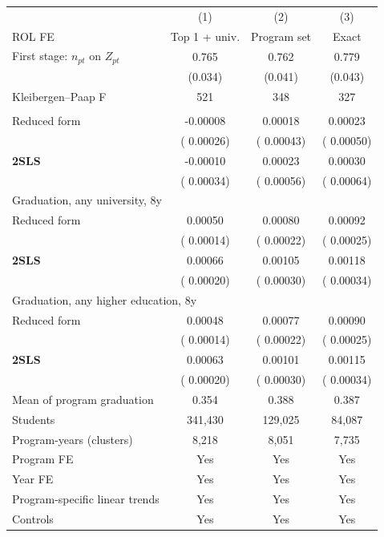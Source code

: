 \begin{tabular}{lccc}
\toprule
 & (1) & (2) & (3) \\
ROL FE & Top 1 + univ. & Program set & Exact \\
\midrule
First stage: \(n_{pt}\) on \(Z_{pt}\) &  0.765\sym{***} &  0.762\sym{***} &  0.779\sym{***} \\
 & (0.034) & (0.041) & (0.043) \\
Kleibergen--Paap F &    521 &    348 &    327 \\
\addlinespace
\multicolumn{4}{l}{Graduation, enrolled program, 8y} \\
\quad Reduced form & -0.00008 &  0.00018 &  0.00023 \\
 & ( 0.00026) & ( 0.00043) & ( 0.00050) \\
\quad \textbf{2SLS} & -0.00010 &  0.00023 &  0.00030 \\
 & ( 0.00034) & ( 0.00056) & ( 0.00064) \\
\multicolumn{4}{l}{Graduation, any university, 8y} \\
\quad Reduced form &  0.00050\sym{***} &  0.00080\sym{***} &  0.00092\sym{***} \\
 & ( 0.00014) & ( 0.00022) & ( 0.00025) \\
\quad \textbf{2SLS} &  0.00066\sym{***} &  0.00105\sym{***} &  0.00118\sym{***} \\
 & ( 0.00020) & ( 0.00030) & ( 0.00034) \\
\multicolumn{4}{l}{Graduation, any higher education, 8y} \\
\quad Reduced form &  0.00048\sym{***} &  0.00077\sym{***} &  0.00090\sym{***} \\
 & ( 0.00014) & ( 0.00022) & ( 0.00025) \\
\quad \textbf{2SLS} &  0.00063\sym{***} &  0.00101\sym{***} &  0.00115\sym{***} \\
 & ( 0.00020) & ( 0.00030) & ( 0.00034) \\
\midrule
Mean of program graduation & 0.354 & 0.388 & 0.387 \\
Students &   341,430 &   129,025 &    84,087 \\
Program-years (clusters) &  8,218 &  8,051 &  7,735 \\
\midrule
Program FE & Yes & Yes & Yes \\
Year FE & Yes & Yes & Yes \\
Program-specific linear trends & Yes & Yes & Yes \\
Controls & Yes & Yes & Yes \\
\bottomrule
\end{tabular}
